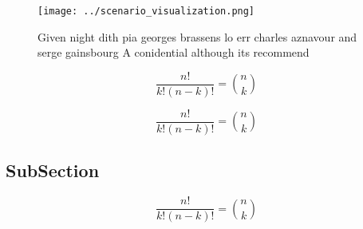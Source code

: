 \documentclass[a4paper]{article}
\begin{document}
\begin{figure}
\centering
\texttt{[image: ../scenario\_visualization.png]}
\caption{Given night dith pia georges brassens lo err charles aznavour and serge gainsbourg A conidential although its recommend
}
\end{figure}
 
\[ \frac{n!}{k!(n-k)!} = \binom{n}{k} \]

\[ \frac{n!}{k!(n-k)!} = \binom{n}{k} \]

\subsection{SubSection}

\[ \frac{n!}{k!(n-k)!} = \binom{n}{k} \]
\end{document}
